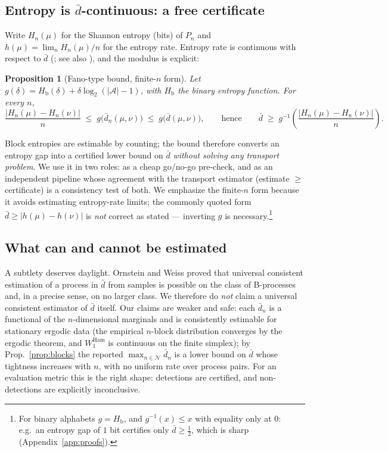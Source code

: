 \documentclass[11pt]{article}
\newtheorem{proposition}{Proposition}[section]
\newcommand{\dbar}{\bar d}
\newcommand{\Hb}{H_{\mathrm b}}
\newcommand{\A}{\mathcal A}
\begin{document}
\subsection{Entropy is $\dbar$-continuous: a free certificate}\label{sec:fano}

Write $H_n(\mu)$ for the Shannon entropy (bits) of $P_n$ and
$h(\mu)=\lim_n H_n(\mu)/n$ for the entropy rate. Entropy rate is continuous with
respect to $\dbar$ (\citealp[\S I.9]{shields1996ergodic}; see also
\citealp{marton1996bounding}), and the modulus is explicit:

\begin{proposition}[Fano-type bound, finite-$n$ form]\label{prop:fano}
Let $g(\delta)=\Hb(\delta)+\delta\log_2(|\A|-1)$, with $\Hb$ the binary entropy
function. For every $n$,
\[
\frac{|H_n(\mu)-H_n(\nu)|}{n} \;\le\; g\big(\dbar_n(\mu,\nu)\big) \;\le\; g\big(\dbar(\mu,\nu)\big),
\qquad\text{hence}\qquad
\dbar \;\ge\; g^{-1}\!\left(\frac{|H_n(\mu)-H_n(\nu)|}{n}\right).
\]
\end{proposition}

Block entropies are estimable by counting; the bound therefore converts an entropy gap
into a certified lower bound on $\dbar$ \emph{without solving any transport problem}.
We use it in two roles: as a cheap go/no-go pre-check, and as an independent pipeline
whose agreement with the transport estimator (estimate $\ge$ certificate) is a
consistency test of both. We emphasize the finite-$n$ form because it avoids estimating
entropy-rate limits; the commonly quoted form $\dbar\ge|h(\mu)-h(\nu)|$ is \emph{not}
correct as stated --- inverting $g$ is necessary.\footnote{For binary alphabets
$g=\Hb$, and $g^{-1}(x)\le x$ with equality only at $0$: e.g.\ an entropy gap of $1$
bit certifies only $\dbar\ge\tfrac12$, which is sharp (Appendix~\ref{app:proofs}).}

\subsection{What can and cannot be estimated}\label{sec:estimability}

A subtlety deserves daylight. Ornstein and Weiss \citep{ornstein1990sampling} proved
that universal consistent estimation of a process in $\dbar$ from samples is possible
on the class of B-processes and, in a precise sense, on no larger class. We therefore
do \emph{not} claim a universal consistent estimator of $\dbar$ itself. Our claims are
weaker and safe: each $\dbar_n$ is a functional of the $n$-dimensional marginals and is
consistently estimable for stationary ergodic data (the empirical $n$-block
distribution converges by the ergodic theorem, and $W_1^{\mathrm{Ham}}$ is continuous on
the finite simplex); by Prop.~\ref{prop:blocks} the reported
$\max_{n\in\mathcal N}\dbar_n$ is a lower bound on $\dbar$ whose tightness increases
with $n$, with no uniform rate over process pairs. For an evaluation metric this is the
right shape: detections are certified, and non-detections are explicitly inconclusive.
\end{document}
